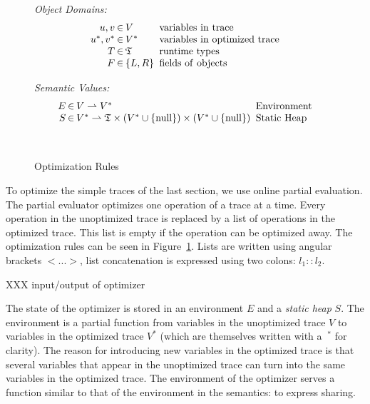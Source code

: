 \documentclass[preprint]{sigplanconf}
\begin{document}
\begin{figure}
\begin{minipage}[b]{7 cm}
\emph{Object Domains:}
$$\setlength\arraycolsep{0.1em}
 \begin{array}{rcll}
    u,v & \in & V & \mathrm{\ variables\ in\ trace}\\
    u^*,v^* & \in & V^* & \mathrm{\ variables\ in\ optimized\ trace}\\
    T & \in & \mathfrak{T} & \mathrm{\ runtime\ types}\\
    F & \in & \left\{ L,R\right\} & \mathrm{\ fields\ of\ objects}\\
 \end{array}
$$
\end{minipage}
\begin{minipage}[b]{5 cm}
\emph{Semantic Values:}
$$\setlength\arraycolsep{0.1em}
 \begin{array}{rcll}
    E & \in & V\rightharpoonup V^* & \mathrm{\ Environment}\\
    S & \in & V^*\rightharpoonup\mathfrak{T}\times(V^*\cup \{ \mathrm{null} \})\times (V^*\cup \{ \mathrm{null}\} ) & \mathrm{\ Static\ Heap}\\
    \\
    \\
 \end{array}
$$
\end{minipage}
\caption{Optimization Rules}
\label{fig:optimization}
\end{figure}

To optimize the simple traces of the last section, we use online partial
evaluation. The partial evaluator optimizes one operation of a trace at a
time. Every operation in the unoptimized trace is replaced by a list of
operations in the optimized trace. This list is empty if the operation can be
optimized away. The optimization rules can be seen in
Figure~\ref{fig:optimization}. Lists are written using angular brackets $<...>$,
list concatenation is expressed using two colons: $l_1::l_2$.

XXX input/output of optimizer

The state of the optimizer is stored in an environment $E$ and a \emph{static
heap} $S$. The environment is a partial function from variables in the
unoptimized trace $V$ to variables in the optimized trace $V^*$ (which are
themselves written with a
$\ ^*$ for clarity). The reason for introducing new variables in the optimized
trace is that several variables that appear in the unoptimized trace can turn
into the same variables in the optimized trace. The environment of the
optimizer serves a function similar to that of the environment in the
semantics: to express sharing.
\end{document}
